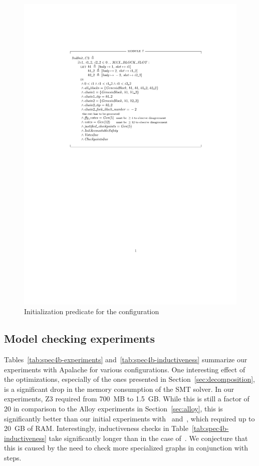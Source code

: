\begin{figure}
    \includegraphics[width=\textwidth]{images/indinit-c3}
    \caption{Initialization predicate for the
             configuration~}\label{fig:indinit-c3}
\end{figure}

\subsection{Model checking experiments}

Tables~\ref{tab:spec4b-experiments} and~\ref{tab:spec4b-inductiveness}
summarize our experiments with Apalache for various configurations. One
interesting effect of the optimizations, especially of the ones presented in
Section~\ref{sec:decomposition}, is a significant drop in the memory
consumption of the SMT solver. In our experiments, Z3 required from 700~MB to
1.5~GB\@. While this is still a factor of 20 in comparison to the Alloy
experiments in Section~\ref{sec:alloy}, this is significantly better than our
initial experiments with~\SpecTwo{} and~\SpecThree{}, which required up to
20~GB of RAM\@. Interestingly, inductiveness checks in
Table~\ref{tab:spec4b-inductiveness} take significantly longer than in the case
of~\SpecFour{}. We conjecture that this is caused by the need to check more
specialized graphs in conjunction with steps.

